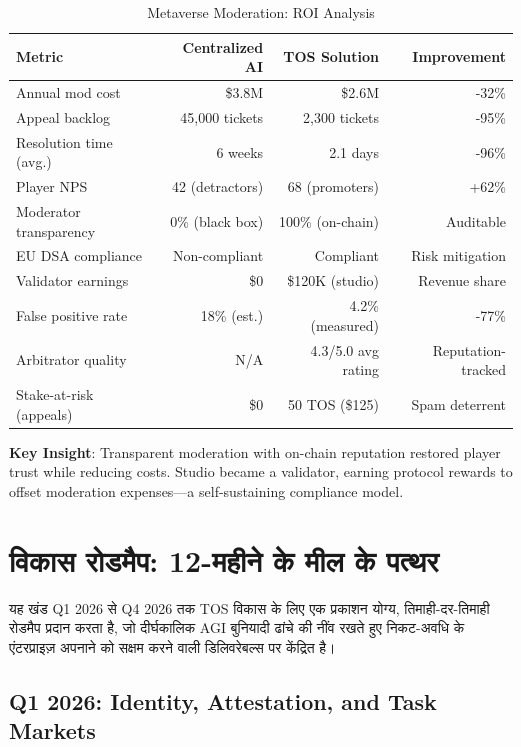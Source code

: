 \documentclass[11pt]{article}
\begin{document}
\begin{itemize}[noitemsep]
\begin{itemize}[noitemsep]
\begin{itemize}[noitemsep]
\begin{itemize}[noitemsep]
\begin{itemize}[noitemsep]
\begin{itemize}[noitemsep]
\begin{table}[H]
\centering
\caption{Metaverse Moderation: ROI Analysis}
\label{tab:metaverse-roi}
\begin{tabular}{@{}lrrr@{}}
\toprule
\textbf{Metric} & \textbf{Centralized AI} & \textbf{TOS Solution} & \textbf{Improvement} \\ \midrule
Annual mod cost & \$3.8M & \$2.6M & -32\% \\
Appeal backlog & 45,000 tickets & 2,300 tickets & -95\% \\
Resolution time (avg.) & 6 weeks & 2.1 days & -96\% \\
Player NPS & 42 (detractors) & 68 (promoters) & +62\% \\
Moderator transparency & 0\% (black box) & 100\% (on-chain) & Auditable \\
EU DSA compliance & Non-compliant & Compliant & Risk mitigation \\
Validator earnings & \$0 & \$120K (studio) & Revenue share \\
False positive rate & 18\% (est.) & 4.2\% (measured) & -77\% \\
Arbitrator quality & N/A & 4.3/5.0 avg rating & Reputation-tracked \\
Stake-at-risk (appeals) & \$0 & 50 TOS (\$125) & Spam deterrent \\
\bottomrule
\end{tabular}
\end{table}

\textbf{Key Insight}: Transparent moderation with on-chain reputation restored player trust while reducing costs. Studio became a validator, earning protocol rewards to offset moderation expenses—a self-sustaining compliance model.

\section{विकास रोडमैप: 12-महीने के मील के पत्थर}
\label{sec:12month-roadmap}

यह खंड Q1 2026 से Q4 2026 तक TOS विकास के लिए एक प्रकाशन योग्य, तिमाही-दर-तिमाही रोडमैप प्रदान करता है, जो दीर्घकालिक AGI बुनियादी ढांचे की नींव रखते हुए निकट-अवधि के एंटरप्राइज़ अपनाने को सक्षम करने वाली डिलिवरेबल्स पर केंद्रित है।

\subsection{Q1 2026: Identity, Attestation, and Task Markets}


\end{itemize}
\end{itemize}
\end{itemize}
\end{itemize}
\end{itemize}
\end{itemize}
\end{document}
